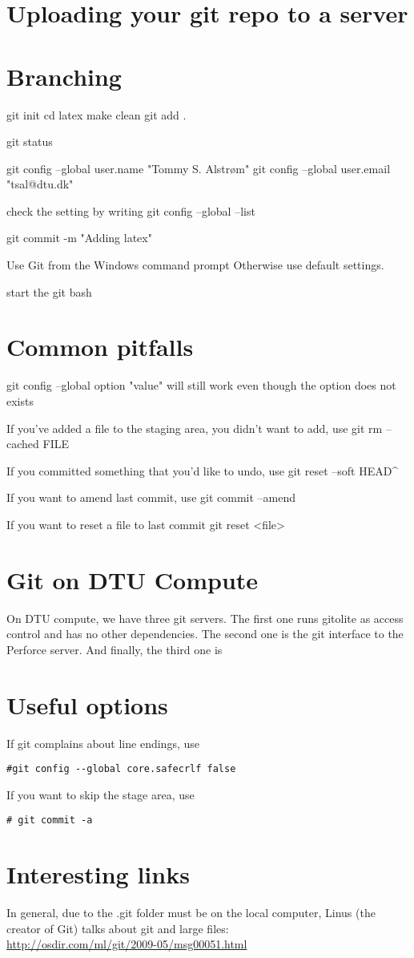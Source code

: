 \documentclass[10pt,a4paper]{article}
\begin{document}
\section{Uploading your git repo to a server}


\section{Branching}




git init
cd latex
make clean
git add .

git status

git config --global user.name "Tommy S. Alstrøm"
git config --global user.email "tsal@dtu.dk"

check the setting by writing
git config --global --list

git commit -m "Adding latex"



Use Git from the Windows command prompt
Otherwise use default settings.

start the git bash


\section{Common pitfalls}
git config --global option "value" will still work even though the option does not exists

If you've added a file to the staging area, you didn't want to add, use
git rm --cached FILE

If you committed something that you'd like to undo, use
git reset --soft HEAD\string^
 
If you want to amend last commit, use
git commit --amend

If you want to reset a file to last commit
git reset <file>

\section{Git on DTU Compute}
On DTU compute, we have three git servers. The first one runs gitolite as access control and has no other dependencies. The second one is the git interface to the Perforce server. And finally, the third one is  


\section{Useful options}
If git complains about line endings, use
\begin{lstlisting}
#git config --global core.safecrlf false
\end{lstlisting}
 
If you want to skip the stage area, use
\begin{lstlisting}
# git commit -a 
\end{lstlisting}
\section{Interesting links}
In general, due to the .git folder must be on the local computer, 
Linus (the creator of Git) talks about git and large files:\\
\url{http://osdir.com/ml/git/2009-05/msg00051.html}
\end{document}

